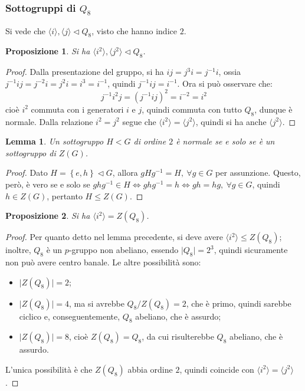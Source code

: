 \documentclass[11pt]{article}
\theoremstyle{style}
\newtheorem{prop}{Proposizione}[section]
\newtheorem{lemma}{Lemma}[teorema]
\numberwithin{equation}{subsection}
\begin{document}
\subsubsection{Sottogruppi di $Q_8$}
Si vede che $\langle i \rangle, \langle j \rangle\lhd Q_8$, visto che hanno indice $2$.
\begin{prop}
	
Si ha $\langle i^2 \rangle,\langle j^2 \rangle \lhd Q_8$.
\end{prop}
\begin{proof}
Dalla presentazione del gruppo, si ha $ij=j^3i=j^{-1}i$, ossia $j^{-1}ij=j^{-2}i = j^2 i = i^3=i^{-1}$, quindi $j^{-1}ij = i^{-1}$.
Ora si pu\`o osservare che:
\[
j^{-1}i^2 j = (j^{-1}ij)^2 = i^{-2}=i^2
\] 
cio\`e $i^2$ commuta con i generatori $i$ e $j$, quindi commuta con tutto $Q_8$, dunque \`e normale.
Dalla relazione $i^2 = j^2$ segue che $\langle i^2 \rangle=\langle j^2 \rangle$, quindi si ha anche $\langle j^2 \rangle$.
\end{proof}
\begin{lemma}
	Un sottogruppo $H<G$ di ordine $2$ \`e normale se e solo se \`e un sottogruppo di $Z(G)$.
\end{lemma}
	\begin{proof}
		Dato $H = \left\{ e , h \right\} \lhd G$, allora $g H g^{-1}= H , \ \forall g \in G$ per assunzione. 
		Questo, per\`o, \`e vero se e solo se $ghg^{-1}\in H \iff ghg^{-1}=h \iff gh=hg, \ \forall g \in G$, quindi $h \in Z(G)$, pertanto $H \le  Z(G)$.
	\end{proof}
\begin{prop}
	Si ha $\langle i^2 \rangle = Z(Q_8)$.
\end{prop}
	\begin{proof}
		Per quanto detto nel lemma precedente, si deve avere $\langle i^2 \rangle \le Z(Q_8)$; inoltre, $Q_8$ \`e un $p$-gruppo non abeliano, essendo $\lvert Q_8 \rvert =2^3$, quindi sicuramente non pu\`o avere centro banale.
		Le altre possibilit\`a sono:
		\begin{itemize}
			\item $\lvert Z(Q_8) \rvert = 2$;
			\item $\lvert Z(Q_8) \rvert = 4$, ma si avrebbe $Q_8 / Z(Q_8) = 2$, che \`e primo, quindi sarebbe ciclico e, conseguentemente, $Q_8$ abeliano, che \`e assurdo;
			\item $\lvert Z(Q_8) \rvert = 8$, cio\`e $Z(Q_8) = Q_8$, da cui risulterebbe $Q_8$ abeliano, che \`e assurdo.
		\end{itemize}
		L'unica possibilit\`a \`e che $Z(Q_8)$ abbia ordine $2$, quindi coincide con $\langle i ^2\rangle = \langle j^2 \rangle$.
	\end{proof}
\end{document}
